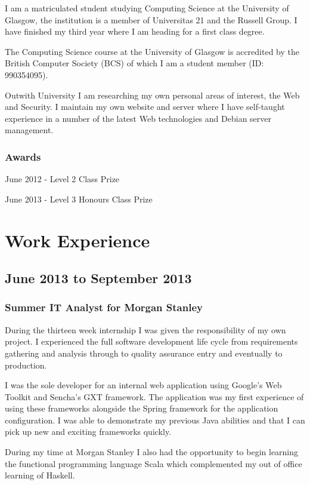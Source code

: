 \documentclass[11pt,a4paper]{article}
\begin{document}
I am a matriculated student studying Computing Science at the University of
Glasgow, the institution is a member of Universitas 21 and the Russell Group.
I have finished my third year where I am heading for a first class degree.

The Computing Science course at the University of Glasgow is accredited by the
British Computer Society (BCS) of which I am a student member (ID: 990354095).

Outwith University I am researching my own personal areas of interest, the
Web and Security. I maintain my own website and server where I have self-taught
experience in a number of the latest Web technologies and Debian server
management.

\subsubsection*{Awards}

June 2012 - Level 2 Class Prize

June 2013 - Level 3 Honours Class Prize

\section*{Work Experience}

\subsection*{June 2013 to September 2013}

\subsubsection*{Summer IT Analyst for Morgan Stanley}

During the thirteen week internship I was given the responsibility of my own
project. I experienced the full software development life cycle from
requirements gathering and analysis through to quality assurance entry and
eventually to production.

I was the sole developer for an internal web application using Google's Web
Toolkit and Sencha's GXT framework. The application was my first experience
of using these frameworks alongside the Spring framework for the application
configuration. I was able to demonstrate my previous Java abilities and that
I can pick up new and exciting frameworks quickly.

During my time at Morgan Stanley I also had the opportunity to begin learning
the functional programming language Scala which complemented my out of office
learning of Haskell.
\end{document}
